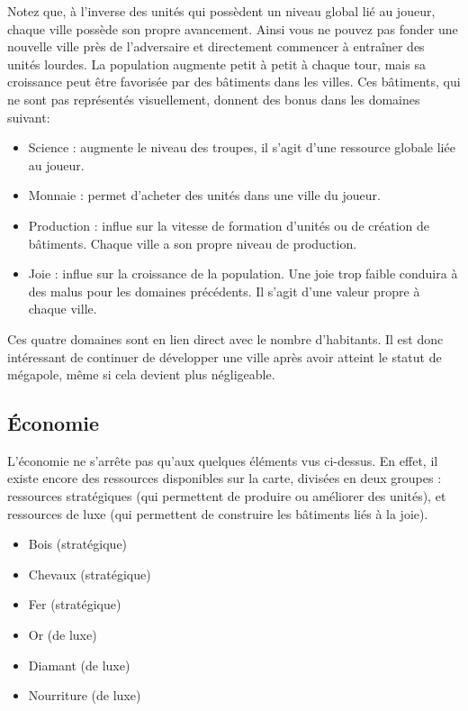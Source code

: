 \documentclass[12pt]{report}
\begin{document}
Notez que, à l’inverse des unités qui possèdent un niveau global lié au joueur,
chaque ville possède son propre avancement. Ainsi vous ne pouvez pas fonder une
nouvelle ville près de l’adversaire et directement commencer à entraîner des
unités lourdes. La population augmente petit à petit à chaque tour, mais sa
croissance peut être favorisée par des bâtiments dans les villes. Ces bâtiments,
qui ne sont pas représentés visuellement, donnent des bonus dans les domaines
suivant:

\begin{itemize}
    \item Science : augmente le niveau des troupes, il s’agit d’une ressource
        globale liée au joueur.
    \item Monnaie : permet d’acheter des unités dans une ville du joueur.
    \item Production : influe sur la vitesse de formation d’unités ou de
        création de bâtiments. Chaque ville a son propre niveau de production.
    \item Joie : influe sur la croissance de la population. Une joie trop faible
        conduira à des malus pour les domaines précédents. Il s’agit d’une
        valeur propre à chaque ville.
\end{itemize}

Ces quatre domaines sont en lien direct avec le nombre d’habitants. Il est donc
intéressant de continuer de développer une ville après avoir atteint le statut
de mégapole, même si cela devient plus négligeable.

\subsection{Économie}

L’économie ne s’arrête pas qu’aux quelques éléments vus ci-dessus. En effet, il
existe encore des ressources disponibles sur la carte, divisées en deux groupes
: ressources stratégiques (qui permettent de produire ou améliorer des unités),
et ressources de luxe (qui permettent de construire les bâtiments liés à la
joie).

\begin{itemize}
    \item Bois (stratégique)
    \item Chevaux (stratégique)
    \item Fer (stratégique)
    \item Or (de luxe)
    \item Diamant (de luxe)
    \item Nourriture (de luxe)
\end{itemize}
\end{document}
